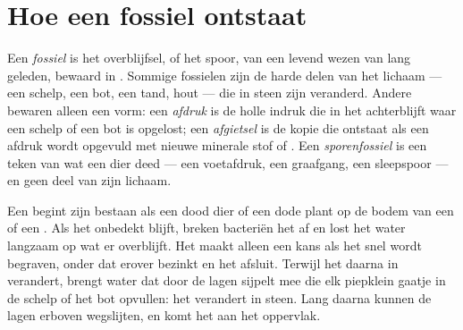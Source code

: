 \section{Hoe een fossiel ontstaat}

\begin{definition}[Fossiel]\label{def:g7:sediments-and-fossils:fossil}
Een \emph{fossiel} is het overblijfsel, of het spoor, van
een levend wezen van lang geleden, bewaard in . Sommige fossielen
zijn de harde delen van het lichaam --- een schelp, een bot, een tand,
hout --- die in steen zijn veranderd. Andere bewaren alleen een vorm: een
\emph{afdruk} is de holle indruk die in het 
achterblijft waar een schelp of een bot is opgelost; een
\emph{afgietsel} is de kopie die ontstaat als een afdruk
wordt opgevuld met nieuwe minerale stof of . Een
\emph{sporenfossiel} is een teken van wat een dier
deed --- een voetafdruk, een graafgang, een sleepspoor --- en geen deel van
zijn lichaam.
\end{definition}

Een  begint zijn bestaan als een dood dier of een dode plant op de
bodem van een  of een . Als het onbedekt blijft, breken bacteriën
het af en lost het water langzaam op wat er overblijft. Het maakt alleen
een kans als het snel wordt begraven, onder  dat erover bezinkt en
het afsluit. Terwijl het  daarna in  verandert, brengt
water dat door de lagen sijpelt  mee die elk piepklein gaatje in
de schelp of het bot opvullen: het verandert in steen. Lang daarna kunnen
de lagen erboven wegslijten, en komt het  aan het oppervlak.

